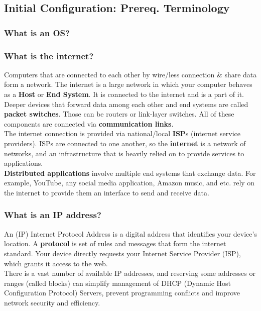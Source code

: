 \documentclass[a4paper, 10pt]{article}
\begin{document}
        \subsection{Initial Configuration: Prereq. Terminology}
            \subsubsection{What is an OS?}
            \subsubsection{What is the internet?}
                Computers that are connected to each other by wire/less connection & share data form a network. 
                The internet is a large network in which your computer behaves as a \textbf{Host} or \textbf{End System}. It is connected to the internet and is a part of it.
                Deeper devices that forward data among each other and end systems are called \textbf{packet switches}. Those can be routers or link-layer switches.
                All of these components are connected via \textbf{communication links}. \\

                The internet connection is provided via national/local \textbf{ISP}s (internet service providers). ISPs are connected to one another, so the \textbf{internet} is a network of networks, and an infrastructure that is heavily relied on to provide services to applications. \\

                \textbf{Distributed applications} involve multiple end systems that exchange data. For example, YouTube, any social media application, Amazon music, and etc. rely on the internet to provide them an interface to send and receive data.

            \subsubsection{What is an IP address?}
                An (IP) Internet Protocol Address is a digital address that identifies your device’s location.
                A \textbf{protocol} is set of rules and messages that form the internet standard. 
                Your device directly requests your Internet Service Provider (ISP), which grants it access to the web. \\

                There is a vast number of available IP addresses, and reserving some addresses or ranges (called blocks) can simplify management of DHCP (Dynamic Host Configuration Protocol) Servers, prevent programming conflicts and improve network security and efficiency. 
\end{document}
